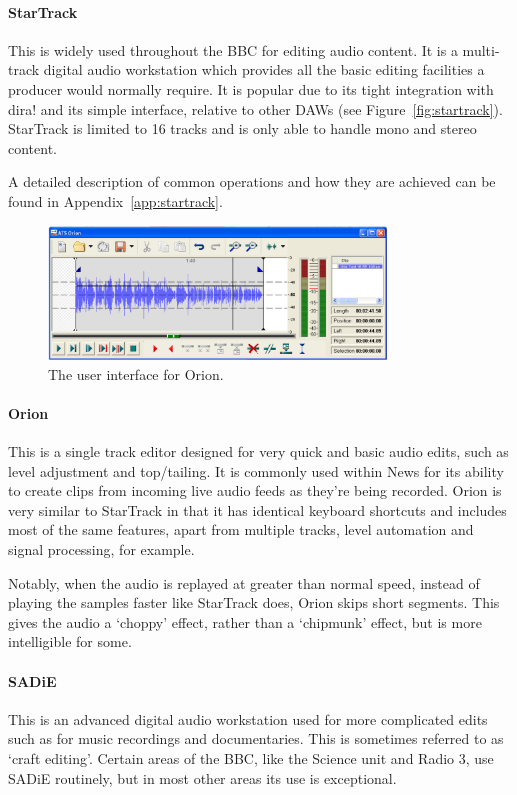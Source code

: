 \paragraph{StarTrack}\label{sec:startrack}
This is widely used throughout the BBC for editing audio content. It is a
multi-track digital audio workstation which provides all the basic editing
facilities a producer would normally require. It is popular due to its tight
integration with dira! and its simple interface, relative to other DAWs (see
Figure~\ref{fig:startrack}).  StarTrack is limited to 16 tracks and is only
able to handle mono and stereo content.

A detailed description of common operations and how they are achieved can be
found in Appendix~\ref{app:startrack}.

\begin{figure}[p]
\centering
\includegraphics[width=0.8\textwidth]{figs/orion.png}
\caption{The user interface for Orion.}
\label{fig:orion}
\end{figure}

\paragraph{Orion}
This is a single track editor designed for very quick and basic audio edits,
such as level adjustment and top/tailing. It is commonly used within News for
its ability to create clips from incoming live audio feeds as they're being
recorded. Orion is very similar to StarTrack in that it has identical keyboard
shortcuts and includes most of the same features, apart from multiple tracks,
level automation and signal processing, for example.

Notably, when the audio is replayed at greater than normal speed, instead of
playing the samples faster like StarTrack does, Orion skips short segments.
This gives the audio a `choppy' effect, rather than a `chipmunk' effect, but is
more intelligible for some.

\paragraph{SADiE}
This is an advanced digital audio workstation used for more complicated edits
such as for music recordings and documentaries. This is sometimes referred to
as `craft editing'. Certain areas of the BBC, like the Science unit and Radio
3, use SADiE routinely, but in most other areas its use is exceptional.

